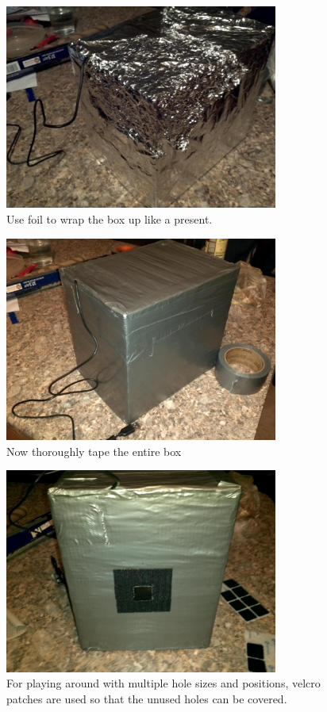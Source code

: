 \documentclass[13pt]{article}
\begin{document}
\begin{figure}[ht!]
\centering
\includegraphics[width=0.8\textwidth]{eps/foilBox.eps}
\caption{Use foil to wrap the box up like a present.}
\end{figure}

\begin{figure}[ht!]
\centering
\includegraphics[width=0.8\textwidth]{eps/tapedBox.eps}
\caption{Now thoroughly tape the entire box}
\end{figure}

\begin{figure}[ht!]
\centering
\includegraphics[width=0.8\textwidth]{eps/velcroHoles.eps}
\caption{For playing around with multiple hole sizes and positions, velcro patches are used so that the unused holes can be covered.}
\end{figure}
\end{document}
